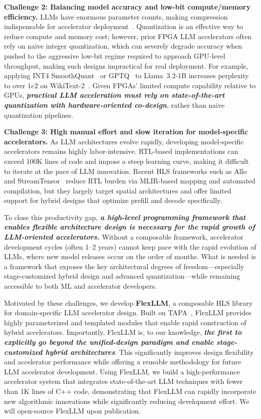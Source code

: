 \documentclass[conference]{IEEEtran}
\begin{document}
\textbf{Challenge 2: Balancing model accuracy and low-bit compute/memory efficiency.}  
LLMs have enormous parameter counts, making compression indispensable for accelerator deployment~\cite{chen2024understanding, zeng2024flightllm}. Quantization is an effective way to reduce compute and memory cost; however, prior FPGA LLM accelerators often rely on naive integer quantization, which can severely degrade accuracy when pushed to the aggressive low-bit regime required to approach GPU-level throughput, making such designs impractical for real deployment. For example, applying INT4 SmoothQuant~\cite{xiao2023smoothquant} or GPTQ~\cite{frantar2022gptq} to Llama~3.2-1B increases perplexity to over $1e2$ on WikiText-2~\cite{liu2024spinquant}. Given FPGAs' limited compute capability relative to GPUs, \textbf{\textit{practical LLM acceleration must rely on state-of-the-art quantization with hardware-oriented co-design}}, rather than naive quantization pipelines.


\textbf{Challenge 3: High manual effort and slow iteration for model-specific accelerators.}  
As LLM architectures evolve rapidly, developing model-specific accelerators remains highly labor-intensive. RTL-based implementations can exceed 100K lines of code and impose a steep learning curve, making it difficult to iterate at the pace of LLM innovation. Recent HLS frameworks such as Allo~\cite{chen2024allo} and StreamTensor~\cite{ye2025streamtensor} reduce RTL burden via MLIR-based mapping and automated compilation, but they largely target spatial architectures and offer limited support for hybrid designs that optimize prefill and decode specifically.

To close this productivity gap, \textbf{\textit{a high-level programming framework that enables flexible architecture design is necessary for the rapid growth of LLM-oriented accelerators.}} Without a composable framework, accelerator development cycles (often 1--2 years) cannot keep pace with the rapid evolution of LLMs, where new model releases occur on the order of months. What is needed is a framework that exposes the key architectural degrees of freedom—especially stage-customized hybrid design and advanced quantization—while remaining accessible to both ML and accelerator developers.


Motivated by these challenges, we develop \textbf{FlexLLM}, a composable HLS library for domain-specific LLM accelerator design. Built on TAPA~\cite{guo2023tapa}, FlexLLM provides highly parameterized and templated modules that enable rapid construction of hybrid accelerators. Importantly, FlexLLM is, to our knowledge, \textbf{\textit{the first to explicitly go beyond the unified-design paradigm and enable stage-customized hybrid architectures}}. This significantly improves design flexibility and accelerator performance while offering a reusable methodology for future LLM accelerator development. Using FlexLLM, we build a high-performance accelerator system that integrates state-of-the-art LLM techniques with fewer than 1K lines of C++ code, demonstrating that FlexLLM can rapidly incorporate new algorithmic innovations while significantly reducing development effort. We will open-source FlexLLM upon publication.   
\end{document}
